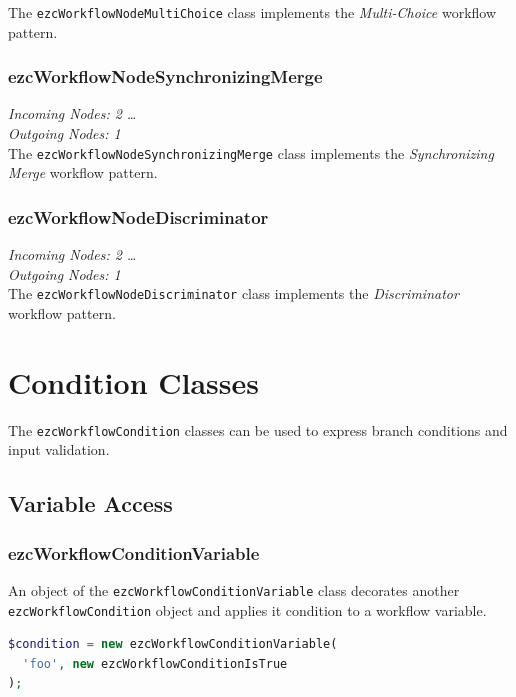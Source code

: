 The \texttt{ezcWorkflowNodeMultiChoice} class implements the \emph{Multi-Choice}
workflow pattern.

\subsubsection{ezcWorkflowNodeSynchronizingMerge}

\emph{Incoming Nodes: 2 \dots *}\\
\emph{Outgoing Nodes: 1}\\

The \texttt{ezcWorkflowNodeSynchronizingMerge} class implements the
\emph{Synchronizing Merge} workflow pattern.

\subsubsection{ezcWorkflowNodeDiscriminator}

\emph{Incoming Nodes: 2 \dots *}\\
\emph{Outgoing Nodes: 1}\\

The \texttt{ezcWorkflowNodeDiscriminator} class implements the
\emph{Discriminator} workflow pattern.


\section{Condition Classes}
\label{section-ConditionClasses}

The \texttt{ezcWorkflowCondition} classes can be used to express branch
conditions and input validation.

\subsection{Variable Access}

\subsubsection{ezcWorkflowConditionVariable}

An object of the \texttt{ezcWorkflowConditionVariable} class decorates another\\
\texttt{ezcWorkflowCondition} object and applies it condition to a workflow
variable.

\begin{lstlisting}[language=PHP]
$condition = new ezcWorkflowConditionVariable(
  'foo', new ezcWorkflowConditionIsTrue
);
\end{lstlisting}

